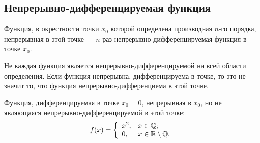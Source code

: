 \subsection{Непрерывно-дифференцируемая функция}
\begin{definition} 
Функция, в окрестности точки \( x_0 \) которой определена производная \( n \)-го порядка, непрерывная в этой точке --- \( n \) раз непрерывно-дифференцируемая функция в точке \( x_0 \).
\end{definition}
Не каждая функция является непрерывно-дифференцируемой на всей области определения. Если функция непрерывна, дифференцируема в точке, то это не значит то, что функция непрерывно-дифференциема в этой точке.
\begin{example} Функция, дифференцируемая в точке \( x_0 = 0 \), непрерывная в \( x_0 \), но не являющаяся непрерывно-дифференцируемой в этой точке: 
\[ 
    f(x) = \left\{ \begin{array}{ll}
        x^2, & x \in \mathbb{Q}; \\
        0,   & x \in \mathbb{R} \setminus \mathbb{Q}.
    \end{array} \right.
\]
\end{example} %
